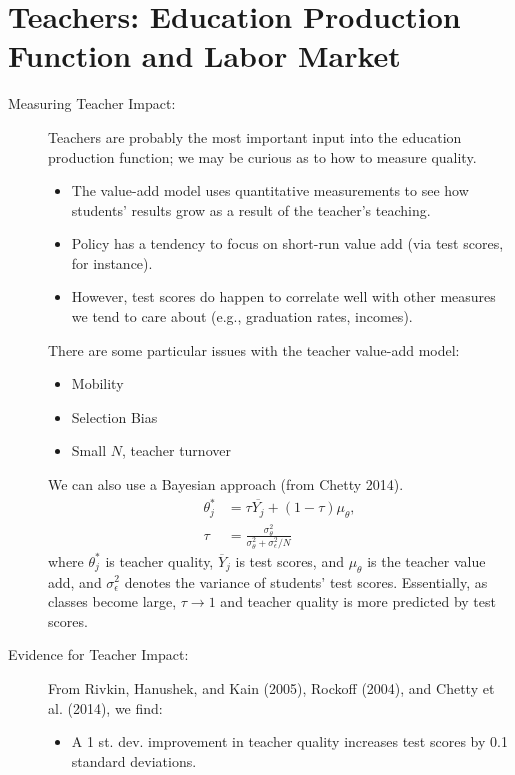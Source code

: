 \documentclass[10pt]{extarticle}
\begin{document}
  \section{Teachers: Education Production Function and Labor Market}%
  \begin{description}
    \item[Measuring Teacher Impact:] Teachers are probably the most important input into the education production function; we may be curious as to how to measure quality.
      \begin{itemize}
        \item The value-add model uses quantitative measurements to see how students' results grow as a result of the teacher's teaching.
        \item Policy has a tendency to focus on short-run value add (via test scores, for instance).
        \item However, test scores do happen to correlate well with other measures we tend to care about (e.g., graduation rates, incomes).
      \end{itemize}
      There are some particular issues with the teacher value-add model:
      \begin{itemize}
        \item Mobility
        \item Selection Bias
        \item Small $N$, teacher turnover
      \end{itemize}
      We can also use a Bayesian approach (from Chetty 2014).
      \begin{align*}
        \theta_{j}^{\ast} &= \tau \overline{Y_{j}} + (1-\tau)\mu_{\theta},\\
        \tau &= \frac{\sigma_{\theta}^2}{\sigma_{\theta}^{2} + \sigma_{\epsilon}^{2}/N}
      \end{align*}
      where $\theta_{j}^{\ast}$ is teacher quality, $\overline{Y}_j$ is test scores, and $\mu_{\theta}$ is the teacher value add, and $\sigma_{\epsilon}^2$ denotes the variance of students' test scores. Essentially, as classes become large, $\tau \rightarrow 1$ and teacher quality is more predicted by test scores.
    \item[Evidence for Teacher Impact:] From Rivkin, Hanushek, and Kain (2005), Rockoff (2004), and Chetty et al. (2014), we find:
      \begin{itemize}
        \item A 1 st. dev. improvement in teacher quality increases test scores by 0.1 standard deviations.

\end{itemize}
\end{description}
\end{document}
